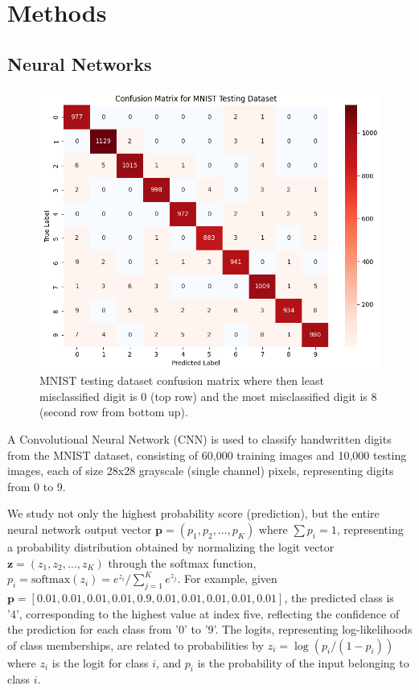 
\section{Methods}

\subsection{Neural Networks}

\begin{figure}[h]
    \centering
    \includegraphics[width=0.99\columnwidth]{Figures/mnist_testing_dataset_confusion_matrix.png}   %
    \caption{MNIST testing dataset confusion matrix where then least misclassified digit is 0 (top row) and the most misclassified digit is 8 (second row from bottom up).}
\label{fig:mnist_testing_dataset_confusion_matrix}
\end{figure}

A Convolutional Neural Network (CNN) is used to classify handwritten digits from the MNIST dataset, consisting of 60,000 training images and 10,000 testing images, each of size 28x28 grayscale (single channel) pixels, representing digits from 0 to 9.

We study not only the highest probability score (prediction), but the entire neural network output vector $\mathbf{p} = (p_1, p_2, \dots, p_K)$ where $\sum p_i = 1$, representing a probability distribution obtained by normalizing the logit vector $\mathbf{z} = (z_1, z_2, \dots, z_K)$ through the softmax function, $p_i = \text{softmax}(z_i) = e^{z_i} / \sum_{j=1}^{K} e^{z_j}$. For example, given $\mathbf{p} = [0.01, 0.01, 0.01, 0.01, 0.9, 0.01, 0.01, 0.01, 0.01, 0.01]$, the predicted class is '4', corresponding to the highest value at index five, reflecting the confidence of the prediction for each class from '0' to '9'. The logits, representing log-likelihoods of class memberships, are related to probabilities by $z_i = \log (p_i / (1 - p_i))$ where $z_i$ is the logit for class $i$, and $p_i$ is the probability of the input belonging to class $i$\cite{goodfellow2016deep, bishop2006pattern}.

